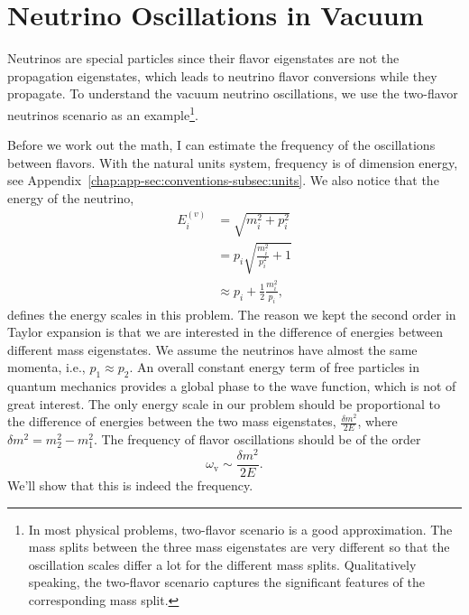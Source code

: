 

\chapter{\label{chap:basics}Neutrino Oscillations in Vacuum}

Neutrinos are special particles since their flavor eigenstates are not the propagation eigenstates, which leads to neutrino flavor conversions while they propagate. To understand the vacuum neutrino oscillations, we use the two-flavor neutrinos scenario as an example\footnote{In most physical problems, two-flavor scenario is a good approximation. The mass splits between the three mass eigenstates are very different so that the oscillation scales differ a lot for the different mass splits. Qualitatively speaking, the two-flavor scenario captures the significant features of the corresponding mass split.}.

Before we work out the math, I can estimate the frequency of the oscillations between flavors. With the natural units system, frequency is of dimension energy, see Appendix~\ref{chap:app-sec:conventions-subsec:units}. We also notice that the energy of the neutrino,
\begin{align}
E_i^{(v)} & = \sqrt{m_i^2 + p_i^2 } \\
& = p_i \sqrt{\frac{m_i^2}{p_i^2} + 1} \\
& \approx p_i + \frac{1}{2} \frac{m_i^2}{p_i},
\label{chap:basics-section:neutrinos-eqn:energy-taylor}
\end{align}
defines the energy scales in this problem. The reason we kept the second order in Taylor expansion is that we are interested in the difference of energies between different mass eigenstates. We assume the neutrinos have almost the same momenta, i.e., $p_1 \approx p_2$. An overall constant energy term of free particles in quantum mechanics provides a global phase to the wave function, which is not of great interest. The only energy scale in our problem should be proportional to the difference of energies between the two mass eigenstates, $\frac{\delta m^2}{2E}$, where $\delta m^2 = m_2^2-m_1^2$. The frequency of flavor oscillations should be of the order
\begin{equation}
    \omega_{\mathrm v} \sim \frac{\delta m^2}{2E}.
    \label{chap:basics-section:neutrinos-eqn:qualitative-method-frequency}
\end{equation}
We'll show that this is indeed the frequency.

